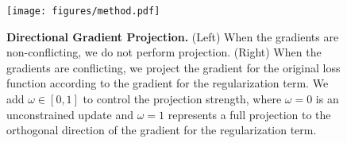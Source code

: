 \begin{figure}[!h]
     \centering
     \texttt{[image: figures/method.pdf]}
     \caption{\textbf{Directional Gradient Projection.} (Left) When the gradients are non-conflicting, we do not perform projection. (Right) When the gradients are conflicting, we project the gradient for the original loss function according to the gradient for the regularization term. We add $\omega \in [0,1]$ to control the projection strength, where $\omega=0$ is an unconstrained update and $\omega=1$ represents a full projection to the orthogonal direction of the gradient for the regularization term.}
     \label{fig:domainnet-ovqa}
\end{figure}